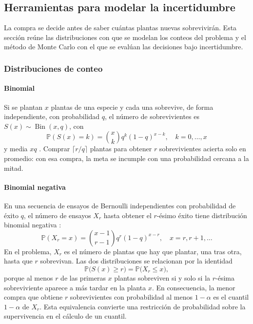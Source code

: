 \subsection{Herramientas para modelar la incertidumbre}
\label{sec:marco-estocastico}

La compra se decide antes de saber cuántas plantas nuevas sobrevivirán. Esta sección reúne las distribuciones con que se modelan los conteos del problema y el método de Monte Carlo con el que se evalúan las decisiones bajo incertidumbre.

\subsubsection{Distribuciones de conteo}
\label{subsec:distribuciones}

\paragraph{Binomial} Si se plantan $x$ plantas de una especie y cada una sobrevive, de forma independiente, con probabilidad $q$, el número de sobrevivientes es $S(x)\sim\operatorname{Bin}(x,q)$, con
\begin{equation}
  \mathbb{P}(S(x)=k)=\binom{x}{k}q^{k}(1-q)^{x-k},\quad k=0,\dots,x
  \label{eq:binomial}
\end{equation}
y media $xq$ \autocite{:berger2002}. Comprar $\lceil r/q\rceil$ plantas para obtener $r$ sobrevivientes acierta solo en promedio: con esa compra, la meta se incumple con una probabilidad cercana a la mitad.

\paragraph{Binomial negativa} En una secuencia de ensayos de Bernoulli independientes con probabilidad de éxito $q$, el número de ensayos $X_r$ hasta obtener el $r$-ésimo éxito tiene distribución binomial negativa \autocite{:berger2002}:
\begin{equation}
  \mathbb{P}(X_r=x)=\binom{x-1}{r-1}q^{r}(1-q)^{x-r},\quad x=r,r+1,\dots
  \label{eq:binneg}
\end{equation}
En el problema, $X_r$ es el número de plantas que hay que plantar, una tras otra, hasta que $r$ sobrevivan. Las dos distribuciones se relacionan por la identidad
\begin{equation}
  \mathbb{P}\bigl(S(x)\geq r\bigr)=\mathbb{P}\bigl(X_r\leq x\bigr),
  \label{eq:dualidad}
\end{equation}
porque al menos $r$ de las primeras $x$ plantas sobreviven si y solo si la $r$-ésima sobreviviente aparece a más tardar en la planta $x$. En consecuencia, la menor compra que obtiene $r$ sobrevivientes con probabilidad al menos $1-\alpha$ es el cuantil $1-\alpha$ de $X_r$. Esta equivalencia convierte una restricción de probabilidad sobre la supervivencia en el cálculo de un cuantil.

